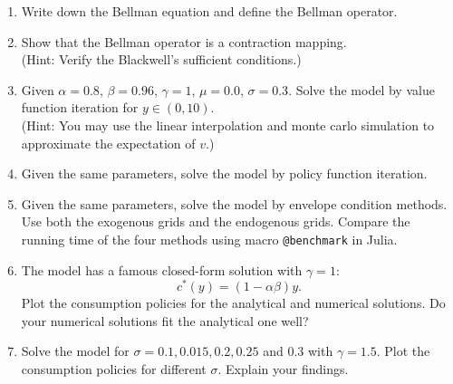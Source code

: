 \documentclass[12pt]{article}
\begin{document}
\begin{enumerate}
    \item Write down the Bellman equation and define the Bellman operator. 
    \item Show that the Bellman operator is a contraction mapping.\\
    (Hint: Verify the Blackwell's sufficient conditions.)
    \item Given $\alpha = 0.8$, $\beta = 0.96$, $\gamma = 1$, $\mu = 0.0$, $\sigma = 0.3$. 
    Solve the model by value function iteration for $y\in(0,10)$.\\
    (Hint: You may use the linear interpolation and monte carlo simulation to 
    approximate the expectation of $v$.)
    \item Given the same parameters, solve the model by policy function 
    iteration. 
    \item Given the same parameters, solve the model by envelope condition 
    methods. Use both the exogenous grids and the endogenous grids.  
    Compare the running time of the four methods using macro 
    \texttt{@benchmark} in Julia. 
    \item The model has a famous closed-form solution with $\gamma = 1$:
    \begin{equation*}
        c^*(y) = (1-\alpha\beta)y.
    \end{equation*}
    Plot the consumption policies for the analytical and numerical solutions. 
    Do your numerical solutions fit the analytical one well?
    \item Solve the model for $\sigma = 0.1, 0.015, 0.2, 0.25$ and $0.3$ with 
    $\gamma = 1.5$. Plot the consumption policies for different $\sigma$. 
    Explain your findings. 
\end{enumerate}
\end{document}
